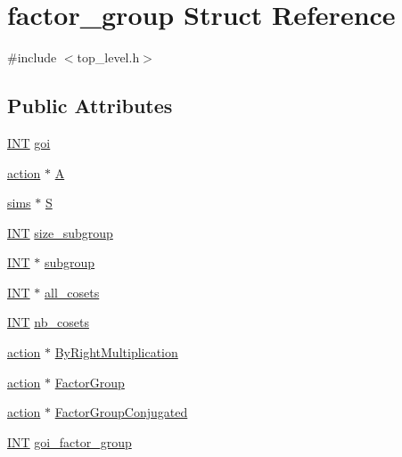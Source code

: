 \hypertarget{structfactor__group}{}\section{factor\+\_\+group Struct Reference}
\label{structfactor__group}


{\ttfamily \#include $<$top\+\_\+level.\+h$>$}

\subsection*{Public Attributes}
\begin{DoxyCompactItemize}
\item 
\mbox{\hyperlink{galois_8h_a09fddde158a3a20bd2dcadb609de11dc}{I\+NT}} \mbox{\hyperlink{structfactor__group_acb086889a96be37c1856bb574d7b8053}{goi}}
\item 
\mbox{\hyperlink{classaction}{action}} $\ast$ \mbox{\hyperlink{structfactor__group_a6f2cf75df87778b9d003af436cddc489}{A}}
\item 
\mbox{\hyperlink{classsims}{sims}} $\ast$ \mbox{\hyperlink{structfactor__group_a328bdac7e2e1680c85507d9e2b748586}{S}}
\item 
\mbox{\hyperlink{galois_8h_a09fddde158a3a20bd2dcadb609de11dc}{I\+NT}} \mbox{\hyperlink{structfactor__group_ad707dc01fcaf4074a25f2be448f2c7bc}{size\+\_\+subgroup}}
\item 
\mbox{\hyperlink{galois_8h_a09fddde158a3a20bd2dcadb609de11dc}{I\+NT}} $\ast$ \mbox{\hyperlink{structfactor__group_a451249bcf132ee2bd59f200461ab989e}{subgroup}}
\item 
\mbox{\hyperlink{galois_8h_a09fddde158a3a20bd2dcadb609de11dc}{I\+NT}} $\ast$ \mbox{\hyperlink{structfactor__group_a85b9b62ed9e3a61a5dd3be5142e80e13}{all\+\_\+cosets}}
\item 
\mbox{\hyperlink{galois_8h_a09fddde158a3a20bd2dcadb609de11dc}{I\+NT}} \mbox{\hyperlink{structfactor__group_a3c63c9afc48084928a92dfcd67612dec}{nb\+\_\+cosets}}
\item 
\mbox{\hyperlink{classaction}{action}} $\ast$ \mbox{\hyperlink{structfactor__group_a36e3bf6483d0018936f2da866efaa835}{By\+Right\+Multiplication}}
\item 
\mbox{\hyperlink{classaction}{action}} $\ast$ \mbox{\hyperlink{structfactor__group_a925810c13d665ca69adf5e1615d9c189}{Factor\+Group}}
\item 
\mbox{\hyperlink{classaction}{action}} $\ast$ \mbox{\hyperlink{structfactor__group_a832dc52bc7860671a761818a8e59e919}{Factor\+Group\+Conjugated}}
\item 
\mbox{\hyperlink{galois_8h_a09fddde158a3a20bd2dcadb609de11dc}{I\+NT}} \mbox{\hyperlink{structfactor__group_a4a5eeba5ee926621990d04c4f4745853}{goi\+\_\+factor\+\_\+group}}
\end{DoxyCompactItemize}


